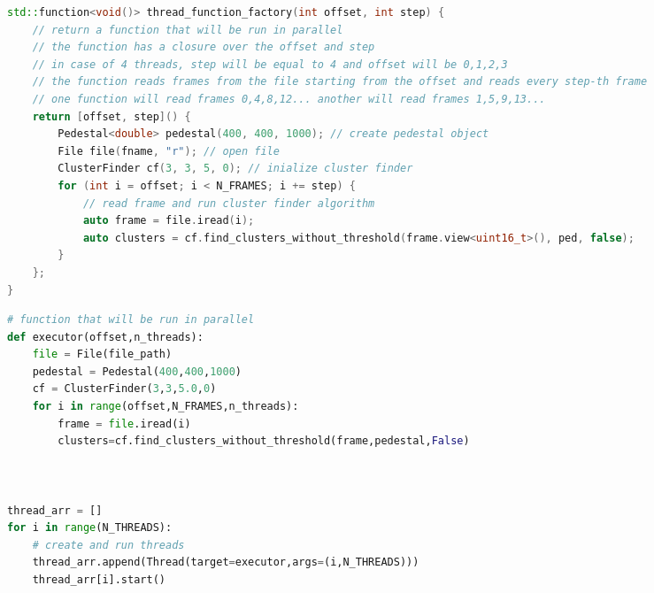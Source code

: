\begin{spacing}{1.2}
\begin{lstlisting}[language=C++, caption=Multi-threaded C++ example, label=lst:multi_threaded_cpp]
std::function<void()> thread_function_factory(int offset, int step) {
    // return a function that will be run in parallel
    // the function has a closure over the offset and step
    // in case of 4 threads, step will be equal to 4 and offset will be 0,1,2,3
    // the function reads frames from the file starting from the offset and reads every step-th frame
    // one function will read frames 0,4,8,12... another will read frames 1,5,9,13...
    return [offset, step]() {
        Pedestal<double> pedestal(400, 400, 1000); // create pedestal object
        File file(fname, "r"); // open file
        ClusterFinder cf(3, 3, 5, 0); // inialize cluster finder
        for (int i = offset; i < N_FRAMES; i += step) {
            // read frame and run cluster finder algorithm
            auto frame = file.iread(i); 
            auto clusters = cf.find_clusters_without_threshold(frame.view<uint16_t>(), ped, false);
        }
    };
}
    \end{lstlisting}

    \begin{lstlisting}[language=Python, caption=Multi-threaded Python example, label=lst:multi_threaded_python]
# function that will be run in parallel
def executor(offset,n_threads):
    file = File(file_path)
    pedestal = Pedestal(400,400,1000)
    cf = ClusterFinder(3,3,5.0,0)
    for i in range(offset,N_FRAMES,n_threads):
        frame = file.iread(i)
        clusters=cf.find_clusters_without_threshold(frame,pedestal,False)

    

thread_arr = []
for i in range(N_THREADS):
    # create and run threads
    thread_arr.append(Thread(target=executor,args=(i,N_THREADS)))
    thread_arr[i].start()
    \end{lstlisting}




\end{spacing}
